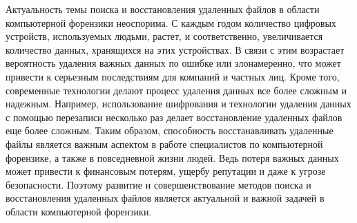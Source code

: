 Актуальность темы поиска и восстановления удаленных файлов в области компьютерной форензики неоспорима. С каждым годом количество цифровых устройств, используемых людьми, растет, и соответственно, увеличивается количество данных, хранящихся на этих устройствах. В связи с этим возрастает вероятность удаления важных данных по ошибке или злонамеренно, что может привести к серьезным последствиям для компаний и частных лиц.
Кроме того, современные технологии делают процесс удаления данных все более сложным и надежным. Например, использование шифрования и технологии удаления данных с помощью перезаписи несколько раз делает восстановление удаленных файлов еще более сложным.
Таким образом, способность восстанавливать удаленные файлы является важным аспектом в работе специалистов по компьютерной форензике, а также в повседневной жизни людей. Ведь потеря важных данных может привести к финансовым потерям, ущербу репутации и даже к угрозе безопасности. Поэтому развитие и совершенствование методов поиска и восстановления удаленных файлов является актуальной и важной задачей в области компьютерной форензики.
